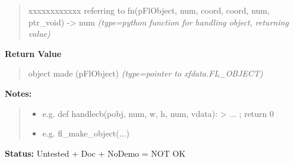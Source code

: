 \begin{boxedminipage}{\funcwidth}
\begin{quote}
\begin{Ventry}{xxxxxxxxxxxx}
referring to fn(pFlObject, num, coord, coord, num, ptr\_void) -> num
            {\it (type=python function for handling object, returning value)}

        \end{Ventry}

      \end{quote}

      \textbf{Return Value}
    \vspace{-1ex}

      \begin{quote}

object made (pFlObject)
      {\it (type=pointer to xfdata.FL\_OBJECT)}

      \end{quote}

\textbf{Notes:}
\begin{quote}
  \begin{itemize}

  \item
    \setlength{\parskip}{0.6ex}

e.g. def handlecb(pobj, num, w, h, num, vdata): > ... ; return 0


  \item 
e.g. fl\_make\_object(...)


\end{itemize}

\end{quote}

\textbf{Status:} 
Untested + Doc + NoDemo = NOT OK


    \end{boxedminipage}

    \label{xformslib:flbasic:fl_add_child}

    \vspace{0.5ex}

